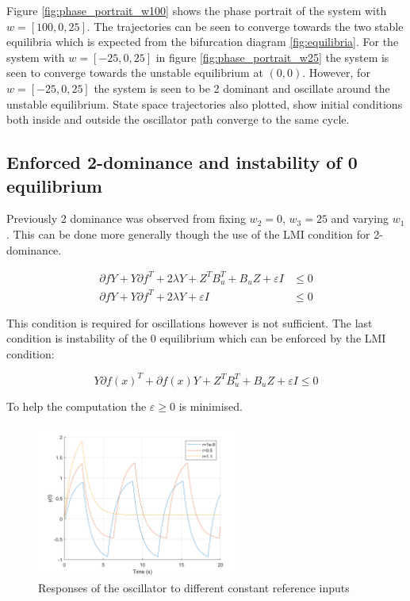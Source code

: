 \documentclass{article}
\begin{document}
Figure \ref{fig:phase_portrait_w100} shows the phase portrait of the system with $w = [100, 0, 25]$.
The trajectories can be seen to converge towards the two stable equilibria which is expected from the bifurcation diagram \ref{fig:equilibria}.
For the system with $w = [-25, 0, 25]$ in figure \ref{fig:phase_portrait_w25} the system is seen to converge towards the unstable equilibrium at $(0,0)$.
However, for $w = [-25, 0, 25]$ the system is seen to be 2 dominant and oscillate around the unstable equilibrium.
State space trajectories also plotted, show initial conditions both inside and outside the oscillator path converge to the same cycle.


\subsection{Enforced 2-dominance and instability of 0 equilibrium}

Previously 2 dominance was observed from fixing $w_2 = 0$, $w_3 = 25$ and varying $w_1$.
This can be done more generally though the use of the LMI condition for 2-dominance.

\begin{align}
    \partial f Y + Y \partial f^T + 2\lambda Y + Z^T B_u^T + B_u Z + \varepsilon I &\leq 0 \\
    \partial f Y + Y \partial f^T + 2\lambda Y + \varepsilon I &\leq 0
\end{align}

This condition is required for oscillations however is not sufficient.
The last condition is instability of the 0 equilibrium which can be enforced by the LMI condition:

\begin{equation}
    Y \partial f(x)^T + \partial f(x) Y + Z^T B_u^T + B_u Z + \varepsilon I \leq 0
\end{equation}

To help the computation the $\varepsilon \geq 0$ is minimised.

\begin{figure}[H]
    \centering
    \includegraphics[width=0.6\textwidth]{figures/13_oscillator_responses.png}
    \caption{Responses of the oscillator to different constant reference inputs}
    \label{fig:13_responses}
\end{figure}
\end{document}
